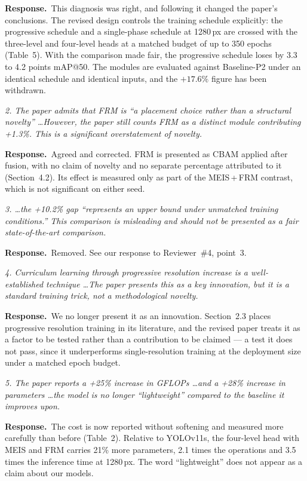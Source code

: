 \documentclass[11pt, a4paper]{article}
\newcommand{\point}[1]{\medskip\noindent\textit{#1}\par}
\newcommand{\reply}{\textbf{Response.}\ }
\begin{document}
\reply This diagnosis was right, and following it changed the paper's conclusions.
The revised design controls the training schedule explicitly: the progressive
schedule and a single-phase schedule at 1280\,px are crossed with the three-level
and four-level heads at a matched budget of up to 350 epochs (Table~5). With the
comparison made fair, the progressive schedule loses by 3.3 to 4.2 points mAP@50.
The modules are evaluated against Baseline-P2 under an identical schedule and
identical inputs, and the $+17.6\%$ figure has been withdrawn.

\point{2. The paper admits that FRM is ``a placement choice rather than a
structural novelty'' \dots However, the paper still counts FRM as a distinct
module contributing +1.3\%. This is a significant overstatement of novelty.}

\reply Agreed and corrected. FRM is presented as CBAM applied after fusion, with
no claim of novelty and no separate percentage attributed to it (Section~4.2). Its
effect is measured only as part of the MEIS\,+\,FRM contrast, which is not
significant on either seed.

\point{3. \dots the +10.2\% gap ``represents an upper bound under unmatched
training conditions.'' This comparison is misleading and should not be presented
as a fair state-of-the-art comparison.}

\reply Removed. See our response to Reviewer~\#4, point~3.

\point{4. Curriculum learning through progressive resolution increase is a
well-established technique \dots The paper presents this as a key innovation, but
it is a standard training trick, not a methodological novelty.}

\reply We no longer present it as an innovation. Section~2.3 places progressive
resolution training in its literature, and the revised paper treats it as a factor
to be tested rather than a contribution to be claimed --- a test it does not pass,
since it underperforms single-resolution training at the deployment size under a
matched epoch budget.

\point{5. The paper reports a +25\% increase in GFLOPs \dots and a +28\% increase
in parameters \dots the model is no longer ``lightweight'' compared to the
baseline it improves upon.}

\reply The cost is now reported without softening and measured more carefully than
before (Table~2). Relative to YOLOv11s, the four-level head with MEIS and FRM
carries 21\% more parameters, 2.1 times the operations and 3.5 times the inference
time at 1280\,px. The word ``lightweight'' does not appear as a claim about our
models.
\end{document}
